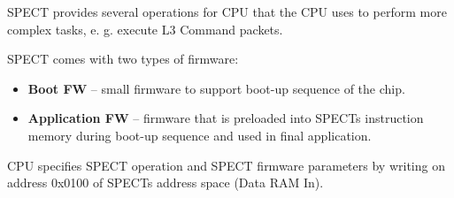 \documentclass[notconfidential]{tropic_design_spec}
\def\LLLCMD{L3 Command packet}
\begin{document}
\newcommand{\SPECTCommandDescription}[1]{
    \multicolumn{6}{|p{.9\textwidth}|}{#1} \\ \hline
}

\newcommand{\SPECTCommandMemHead}[1]{
    \rowcolor{gray!70}
    \multicolumn{6}{|c|}{\color{white}#1} \\ \hline
}

\newcommand{\SPECTCommandMem}[3]{
    \multicolumn{1}{|>{\hsize=0.2\hsize}X}{#1} &
    \multicolumn{1}{|>{\hsize=0.2\hsize}X}{#2} &
    \multicolumn{4}{|>{\hsize=1.5\hsize}X|}{#3} \\ \hline
}

\newcommand{\SPECTCommandCtx}[2]{
    \rowcolor{gray!70}
    \multicolumn{3}{|X}{\color{white}Context In} & \multicolumn{3}{|X|}{\color{white}Context Out} \\ \hline
    \multicolumn{3}{|X}{#1} & \multicolumn{3}{|X|}{#2} \\ \hline
}

\newcommand{\SPECTCommandTable}[1]{
    \begin{xltabular}{\textwidth}{|XXXXXX|}
    \hline
    #1
    \end{xltabular}
}



SPECT provides several operations for CPU that the CPU uses to perform more complex tasks, e. g. execute \LLLCMD{}s.

SPECT comes with two types of firmware:
\begin{itemize}
    \item \textbf{Boot FW} -- small firmware to support boot-up sequence of the chip.
    \item \textbf{Application FW} -- firmware that is preloaded into SPECTs instruction memory during
                                     boot-up sequence and used in final application. 
\end{itemize}


CPU specifies SPECT operation and SPECT firmware parameters by writing\linebreak
{} on address 0x0100 of SPECTs address space (Data RAM In).
\end{document}

